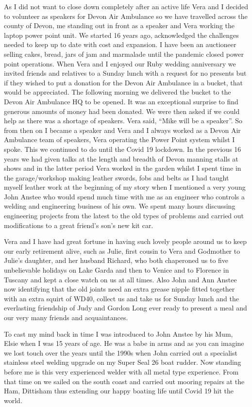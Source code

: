As I did not want to close down completely after an active life Vera and I
decided to volunteer as speakers for Devon Air Ambulance so we have travelled
across the county of Devon, me standing out in front as a speaker and Vera
working the laptop power point unit. We started 16 years ago, acknowledged the
challenges needed to keep up to date with cost and expansion. I have been an
auctioneer selling cakes, bread, jars of jam and marmalade until the pandemic
closed power point operations.
When Vera and I enjoyed our Ruby wedding anniversary we invited friends and
relatives to a Sunday lunch with a request for no presents but if they wished
to put a donation for the Devon Air Ambulance in a bucket, that would be
appreciated. The following morning we delivered the bucket  to the Devon Air
Ambulance HQ to be opened. It was an exceptional surprise to find generous
amounts of money had been donated. We were then asked if we could help as
there was a shortage of speakers. Vera said, ``Mike will be a speaker''. So
from then on I became a speaker and Vera and I always worked as a Devon Air
Ambulance team of speakers, Vera operating the Power Point system whilst I
spoke. This we continued to do until the Covid 19 lockdown. In the previous
16 years we had given talks at the length and breadth of Devon manning stalls
at shows and in the latter period Vera worked in the garden whilst I spent time
in the garage/workshop making leather swords, fobs and belts as I had taught
myself leather work at the beginning of my story when I mentioned a very young
John Anstee who would spend much time with me as an engineer who controls a
welding and engineering business of his own. We spent many hours discussing
engineering projects from the latest to the old types of problems and carried
out modifications to a great friend's son's new kit car.

Vera and I have had great fortune in having such lovely people around us to keep
our early retirement alive, such as Julie, first cousin to Vera and Godmother
to Julie's daughter, and her husband Richard, who both chaperoned us to five
unbelievable holidays on Lake Garda and then to Venice and to Florence in
Tuscany and kept a close watch on us at all times. Also John and Ann Anstee
now identifying that the old joints need an extra grease nipple fitted together
with an extra squirt of WD40, collect us and take us for Sunday lunch and the
everlasting friendship of Judy and Gordon Long ever ready to present a meal and
our very many friends and acquaintances.

To cast my mind back in time I was introduced to John Anstee by his Mum, Elsie
when I was 15 years of age. He was a babe in arms and as you can imagine we
lost touch over the years until the 1990s when John carried out a specialist
stainless steel welding upgrade on my Super Seal 26 boat rudder. Now standing
before me is this very experienced welder with all metal type experience. From
that time on we sailed on the south coast and carried out mooring repairs at
the Ham, Dittisham thus extending our happy boating life until Covid 19 hit the
world.

